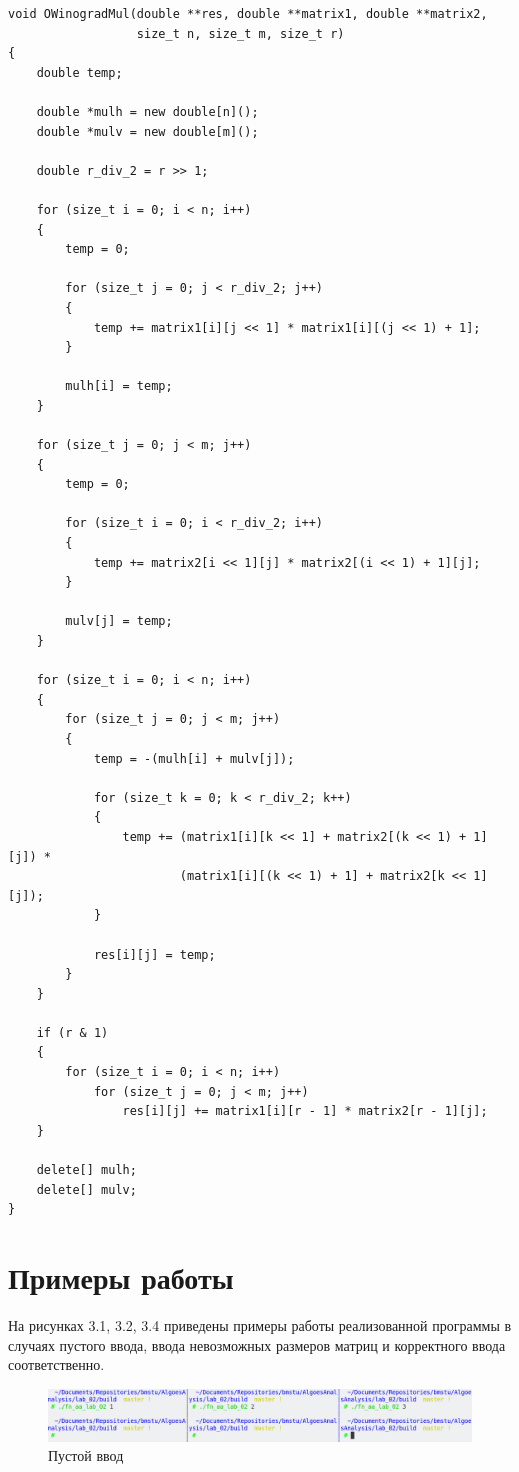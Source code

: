 \begin{lstlisting}[caption=Модифицированный аллгоритм Винограда]
void OWinogradMul(double **res, double **matrix1, double **matrix2,
                  size_t n, size_t m, size_t r)
{
    double temp;

    double *mulh = new double[n]();
    double *mulv = new double[m]();

    double r_div_2 = r >> 1;

    for (size_t i = 0; i < n; i++)
    {
        temp = 0;

        for (size_t j = 0; j < r_div_2; j++)
        {
            temp += matrix1[i][j << 1] * matrix1[i][(j << 1) + 1];
        }

        mulh[i] = temp;
    }

    for (size_t j = 0; j < m; j++)
    {
        temp = 0;

        for (size_t i = 0; i < r_div_2; i++)
        {
            temp += matrix2[i << 1][j] * matrix2[(i << 1) + 1][j];
        }

        mulv[j] = temp;
    }

    for (size_t i = 0; i < n; i++)
    {
        for (size_t j = 0; j < m; j++)
        {
            temp = -(mulh[i] + mulv[j]);

            for (size_t k = 0; k < r_div_2; k++)
            {
                temp += (matrix1[i][k << 1] + matrix2[(k << 1) + 1][j]) *
                        (matrix1[i][(k << 1) + 1] + matrix2[k << 1][j]);
            }

            res[i][j] = temp;
        }
    }

    if (r & 1)
    {
        for (size_t i = 0; i < n; i++)
            for (size_t j = 0; j < m; j++)
                res[i][j] += matrix1[i][r - 1] * matrix2[r - 1][j];
    }

    delete[] mulh;
    delete[] mulv;
}
\end{lstlisting}

\section{Примеры работы}

На рисунках 3.1, 3.2, 3.4 приведены примеры работы реализованной программы в случаях пустого ввода, ввода невозможных размеров матриц и корректного ввода соответственно.

\begin{figure}[H]
    \centering
    \includegraphics[scale=0.45]{images/test1.png}
    \caption{Пустой ввод}
    \label{img:zero-arg}
\end{figure}

